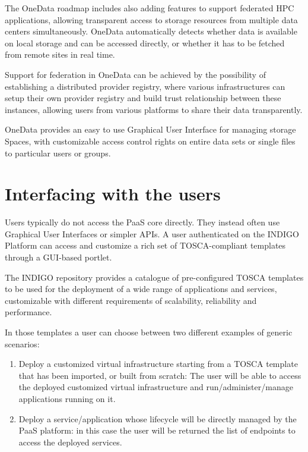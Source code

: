 \documentclass{article}
\begin{document}
The OneData roadmap includes also adding features to support federated HPC applications, allowing transparent access to storage resources from multiple data centers simultaneously. OneData automatically detects whether data is available on 
local storage and can be accessed directly, or whether it has to be fetched from remote sites in real time. 

Support for federation in  OneData can be achieved by the possibility of establishing a distributed provider registry, where various infrastructures can setup their own provider registry and build trust relationship between these instances, allowing users from various platforms to share their data transparently.

OneData  provides  an  easy  to  use  Graphical  User  Interface  for  managing  storage  Spaces,  with customizable   access   control   rights   on   entire   data   sets   or   single   files   to   particular   users   or groups. 






\section{Interfacing with the users}
\label{sec:users}

Users typically do not access the PaaS core directly. They instead often use Graphical User Interfaces or simpler APIs. A user authenticated on the INDIGO Platform can access and customize a rich set of TOSCA-compliant templates through a GUI-based portlet.

The INDIGO repository provides a catalogue of pre-configured TOSCA templates to be used for the deployment of a wide range of applications and services, customizable with different requirements of scalability, reliability and performance. 

In those templates a user can choose between two different examples of generic scenarios:
 
\begin{enumerate}
\item Deploy a customized virtual infrastructure starting from a TOSCA template that has been imported, or built from scratch: The user will be able to access the deployed customized virtual infrastructure and run/administer/manage applications running on it.

\item Deploy a service/application whose lifecycle will be directly managed by the PaaS platform: in this case the user will be returned the list of endpoints to access the deployed services.
\end{enumerate}
\end{document}
